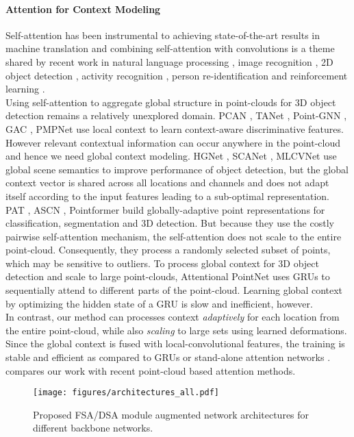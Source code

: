 \documentclass[10pt,twocolumn,letterpaper]{article}
\begin{document}
\paragraph{Attention for Context Modeling}
Self-attention \cite{SA} has been instrumental to achieving state-of-the-art results in machine translation and combining self-attention with convolutions is a theme shared by recent work in natural language processing \cite{NLP-SA}, image recognition \cite{AA}, 2D object detection \cite{AttnUNet}, activity recognition \cite{NL}, person re-identification  \cite{Reid} and reinforcement learning \cite{RL}. 
\\ Using self-attention to aggregate global structure in point-clouds for 3D object detection remains a relatively unexplored domain. PCAN \cite{pcan}, TANet \cite{tanet}, Point-GNN \cite{pointgnn}, GAC \cite{gac}, PMPNet \cite{pmpnet} use local context to learn context-aware discriminative features. However relevant contextual information can occur anywhere in the point-cloud and hence we need global context modeling. HGNet \cite{hgnet}, SCANet \cite{scanet}, MLCVNet \cite{mlcv} use global scene semantics to improve performance of object detection, but the global context vector is shared across all locations and channels and does not adapt itself according to the input features leading to a sub-optimal representation.
PAT \cite{pat}, ASCN \cite{ascn}, Pointformer \cite{pointformer} build globally-adaptive point representations for classification, segmentation and 3D detection. But because they use the costly pairwise self-attention mechanism, the self-attention does not scale to the entire point-cloud. Consequently, they process a randomly selected subset of points, which may be sensitive to outliers. To process global context for 3D object detection and scale to large point-clouds, Attentional PointNet \cite{a-pointnet}  uses GRUs \cite{GRU} to sequentially attend to different parts of the point-cloud. Learning global context by optimizing the hidden state of a GRU is slow and inefficient, however. 
\\ In contrast, our method can processes context \emph{adaptively} for each location from the entire point-cloud, while also \emph{scaling} to large sets using learned deformations. Since the global context is fused with local-convolutional features, the training is stable and efficient as compared to GRUs or stand-alone attention networks \cite{Stand-alone}.  compares our work with recent point-cloud based attention methods. \begin{figure*}[t]
    \centering
    \texttt{[image: figures/architectures\_all.pdf]}
    \caption{Proposed FSA/DSA module augmented network architectures for different backbone networks.}
    \label{fig:architectures}
\end{figure*}
\end{document}
